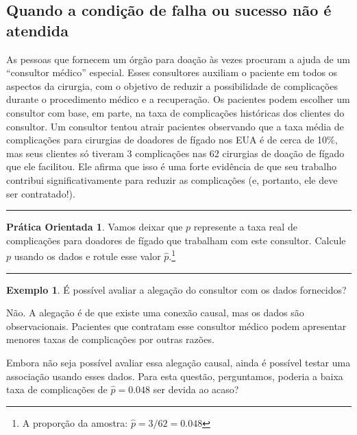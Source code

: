 \documentclass[
]{book}
\theoremstyle{definition}
\theoremstyle{definition}
\newtheorem{example}{Exemplo}[chapter]
\theoremstyle{definition}
\newtheorem{exercise}{Prática Orientada}[chapter]
\theoremstyle{definition}
\theoremstyle{remark}
\begin{document}
\hypertarget{failureSuccessConditionNotMet}{%
\subsection{Quando a condição de falha ou sucesso não é atendida}\label{failureSuccessConditionNotMet}}

As pessoas que fornecem um órgão para doação às vezes procuram a ajuda de um ``consultor médico'' especial. Esses consultores auxiliam o paciente em todos os aspectos da cirurgia, com o objetivo de reduzir a possibilidade de complicações durante o procedimento médico e a recuperação. Os pacientes podem escolher um consultor com base, em parte, na taxa de complicações históricas dos clientes do consultor. Um consultor tentou atrair pacientes observando que a taxa média de complicações para cirurgias de doadores de fígado nos EUA é de cerca de 10\%, mas seus clientes só tiveram 3 complicações nas 62 cirurgias de doação de fígado que ele facilitou. Ele afirma que isso é uma forte evidência de que seu trabalho contribui significativamente para reduzir as complicações (e, portanto, ele deve ser contratado!).

\begin{center}\rule{0.5\linewidth}{0.5pt}\end{center}

\begin{exercise}
\protect\hypertarget{exr:unnamed-chunk-256}{}{\label{exr:unnamed-chunk-256} }Vamos deixar que \(p\) represente a taxa real de complicações para doadores de fígado que trabalham com este consultor. Calcule \(p\) usando os dados e rotule esse valor \(\hat{p}\).\footnote{A proporção da amostra: \(\hat{p} = 3/62 = 0.048\)}
\end{exercise}

\begin{center}\rule{0.5\linewidth}{0.5pt}\end{center}

\begin{example}
\protect\hypertarget{exm:unnamed-chunk-257}{}{\label{exm:unnamed-chunk-257} }É possível avaliar a alegação do consultor com os dados fornecidos?
\end{example}

Não. A alegação é de que existe uma conexão causal, mas os dados são observacionais. Pacientes que contratam esse consultor médico podem apresentar menores taxas de complicações por outras razões.

Embora não seja possível avaliar essa alegação causal, ainda é possível testar uma associação usando esses dados. Para esta questão, perguntamos, poderia a baixa taxa de complicações de \(\hat{p} = 0.048\) ser devida ao acaso?
\end{document}
